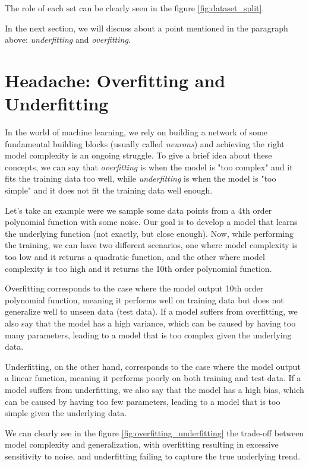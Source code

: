 The role of each set can be clearly seen in the figure \ref{fig:dataset_split}.

In the next section, we will discuss about a point mentioned in the paragraph above: \textit{underfitting} and \textit{overfitting}.

\section{Headache: Overfitting and Underfitting}
In the world of machine learning, we rely on building a network of some fundamental building blocks (usually called \textit{neurons}) and achieving the right model complexity is an ongoing struggle. To give a brief idea about these concepts, we can say that \textit{overfitting} is when the model is "too complex" and it fits the training data too well, while \textit{underfitting} is when the model is "too simple" and it does not fit the training data well enough.

Let's take an example were we sample some data points from a 4th order polynomial function with some noise. Our goal is to develop a model that learns the underlying function (not exactly, but close enough). Now, while performing the training, we can have two different scenarios, one where model complexity is too low and it returns a quadratic function, and the other where model complexity is too high and it returns the 10th order polynomial function.

Overfitting corresponds to the case where the model output 10th order polynomial function, meaning it performs well on training data but does not generalize well to unseen data (test data). If a model suffers from overfitting, we also say that the model has a high variance, which can be caused by having too many parameters, leading to a model that is too complex given the underlying data.

Underfitting, on the other hand, corresponds to the case where the model output a linear function, meaning it performs poorly on both training and test data. If a model suffers from underfitting, we also say that the model has a high bias, which can be caused by having too few parameters, leading to a model that is too simple given the underlying data.

We can clearly see in the figure \ref{fig:overfitting_underfitting} the trade-off between model complexity and generalization, with overfitting resulting in excessive sensitivity to noise, and underfitting failing to capture the true underlying trend.

